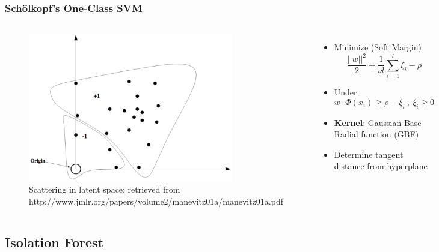 \documentclass{beamer}
\begin{document}
\begin{frame}
\frametitle{Sch\"{o}lkopf's One-Class SVM}
\begin{columns}
    \begin{figure}
        \includegraphics[height=0.5\textheight, width=0.8\textwidth]{images/hyperplane_svm}
        \caption{Scattering in latent space: \tiny retrieved from http://www.jmlr.org/papers/volume2/manevitz01a/manevitz01a.pdf}
    \end{figure}

    \begin{itemize}
    \item Minimize (Soft Margin)
    \begin{equation}
        \frac{||w||^2}{2} + \frac{1}{\nu l}\sum_{i=1}^l \xi_i - \rho
    \end{equation}
    \item Under
    \begin{equation}
        w \cdot \Phi(x_i) \geqslant \rho - \xi_i \ ,\ \xi_i \geqslant 0
    \end{equation}
    \item \textbf{Kernel}: Gaussian Base Radial function (GBF)
    \item Determine tangent distance from hyperplane
    \end{itemize}
\end{columns}
\end{frame}

\subsection{Isolation Forest}
\end{document}
